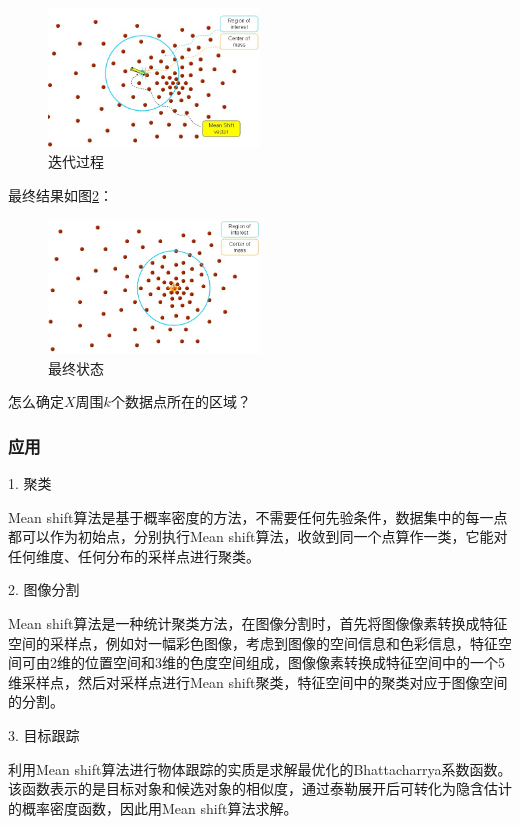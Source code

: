 \documentclass[12pt]{article}
\begin{document}
\begin{figure}[!ht]
\centering
\includegraphics[width=0.5\textwidth]{meanshift2.jpg}
\caption{迭代过程}
\label{fig: meanshift2}
\end{figure} 

最终结果如图\ref{fig: meanshift3}：

\begin{figure}[!ht]
\centering
\includegraphics[width=0.5\textwidth]{meanshift3.jpg}
\caption{最终状态}
\label{fig: meanshift3}
\end{figure} 

怎么确定$X$周围$k$个数据点所在的区域？


\subsubsection{应用}

1. 聚类

Mean shift算法是基于概率密度的方法，不需要任何先验条件，数据集中的每一点都可以作为初始点，分别执行Mean shift算法，收敛到同一个点算作一类，它能对任何维度、任何分布的采样点进行聚类。

2. 图像分割

Mean shift算法是一种统计聚类方法，在图像分割时，首先将图像像素转换成特征空间的采样点，例如対一幅彩色图像，考虑到图像的空间信息和色彩信息，特征空间可由2维的位置空间和3维的色度空间组成，图像像素转换成特征空间中的一个5维采样点，然后对采样点进行Mean shift聚类，特征空间中的聚类对应于图像空间的分割。

3. 目标跟踪

利用Mean shift算法进行物体跟踪的实质是求解最优化的Bhattacharrya系数函数\cite{fashing2005mean}。该函数表示的是目标对象和候选对象的相似度，通过泰勒展开后可转化为隐含估计的概率密度函数，因此用Mean shift算法求解。
\end{document}
